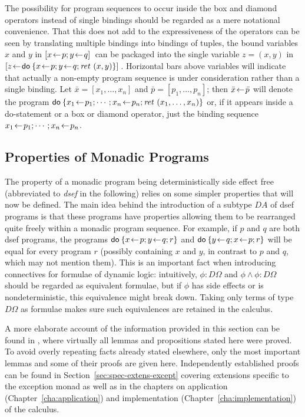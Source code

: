 The possibility for program sequences to occur inside the box and diamond
operators instead of single bindings should be regarded as a mere notational
convenience. That this does not add to the expressiveness of the operators can
be seen by translating multiple bindings into bindings of tuples, \EG the bound
variables $x$ and $y$ in $[x\!\gets\! p; y\!\gets\! q]\,$ can be packaged into the
single variable $z = (x,y)$ in $[z\!\gets\! \mathsf{do}\: \{x\!\gets\! p; y\!\gets\! q;
    \mathit{ret}~(x,y)\}]\,$.  Horizontal bars above variables will indicate that actually a
  non-empty program sequence is under consideration rather than a single
  binding. Let $\bar x = [x_1,\ldots,x_n]$ and $\bar p = [p_1,\ldots,p_n]$; then $\bar x
  \!\gets\! \bar p$ will denote the program $\mathsf{do}\: \{x_1\!\gets\! p_1; \cdots; x_n\!\gets\!
    p_n; \mathit{ret}~(x_1,\ldots,x_n)\}$ or, if it appears inside a do-statement or a box
  or diamond operator, just the
  binding sequence $x_1\!\gets\! p_1;\cdots; x_n\!\gets\! p_n$.


\subsection{Properties of Monadic Programs}
\label{sec:prop-monad-progr}

The property of a monadic program being deterministically side effect free
(abbreviated to \emph{dsef} in the following) relies on some simpler properties
that will now be defined. The main idea behind the introduction of a subtype $D
A$ of dsef programs is that these programs have properties allowing them to be
rearranged quite freely within a monadic program sequence. For example, if $p$
and $q$ are both dsef programs, the programs $\mathsf{do}\: \{x\!\gets\! p; y\!\gets\! q; r\}$
and $\mathsf{do}\: \{y\!\gets\! q; x\!\gets\! p; r\}$ will be equal for every program $r$
(possibly containing $x$ and $y$, in contrast to $p$ and $q$, which may not
mention them). This is an important fact when introducing connectives for
formulae of dynamic logic: intuitively, $\phi : D\Omega$ and $\phi \land \phi : D\Omega$ should be
regarded as equivalent formulae, but if $\phi$ has side effects or is
nondeterministic, this equivalence might break down.  Taking only terms of type
$D \Omega$ as formulae makes sure such equivalences are retained in the calculus.

A more elaborate account of the information provided in this section can be
found in \cite{SchroederMossakowski:PDL}, where virtually all lemmas and
propositions stated here were proved. To avoid overly repeating facts already
stated elsewhere, only the most important lemmas and some of their proofs are
given here.
Independently established proofs can be found in
Section~\ref{sec:spec-extens-except} covering  extensions specific to the
exception monad as well as in the chapters on application
(Chapter~\ref{cha:application}) and implementation
(Chapter~\ref{cha:implementation}) of the calculus.

